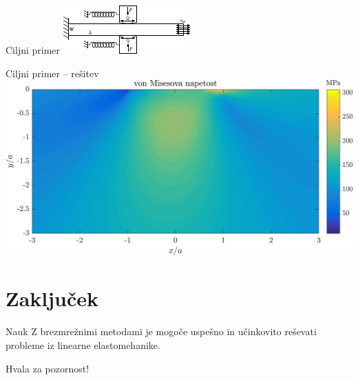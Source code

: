 \begin{frame}{Ciljni primer}
  \centering
  \vfill
  \includegraphics[width=\textwidth]{resources/fwo_shema.pdf}
  \vfill
\end{frame}

\begin{frame}{Ciljni primer -- rešitev}
  \centering
  \vfill
  \includegraphics[width=\textwidth]{resources/fwo_solution.png}
  \vfill
\end{frame}

\section{Zaključek}
\begin{frame}
  \vfill
  \begin{block}{Nauk}
    Z brezmrežnimi metodami je mogoče uspešno in učinkovito reševati probleme iz linearne
    elastomehanike.
  \end{block}

  \vfill
  Hvala za pozornost!
\end{frame}
